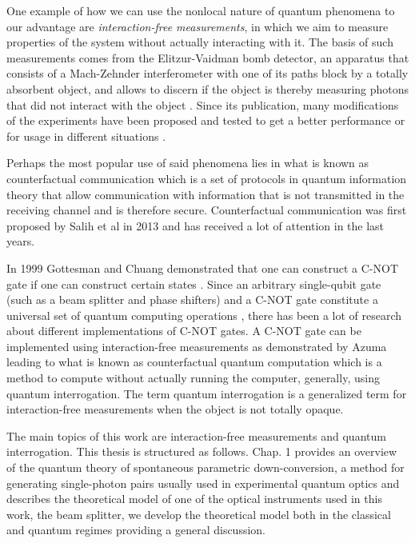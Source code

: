 \documentclass[12pt]{book}
\begin{document}
One example of how we can use the nonlocal nature of quantum phenomena to our advantage are \textit{interaction-free measurements}, in which we aim to measure properties of the system without actually interacting with it. The basis of such measurements comes from the Elitzur-Vaidman bomb detector, an apparatus that consists of a Mach-Zehnder interferometer with one of its paths block by a totally absorbent object, and allows to discern if the object is thereby measuring photons that did not interact with the object  \cite{Elitzur}. Since its publication, many modifications of the experiments have been proposed and tested to get a better performance or for usage in different situations \cite{Azuma,exp,QI1,Azuma2018,electronic}.

Perhaps the most popular use of said phenomena lies in what is known as counterfactual communication which is a set of protocols in quantum information theory that allow communication with information that is not transmitted in the receiving channel and is therefore secure. Counterfactual communication was first proposed by Salih et al in 2013 \cite{CComunication} and has received a lot of attention in the last years.

In 1999 Gottesman and Chuang demonstrated that one can construct a C-NOT gate if one can construct certain states \cite{Gottesman}. Since an arbitrary single-qubit gate (such as a beam splitter and phase shifters) and a C-NOT gate constitute a universal set of quantum computing operations \cite{chuang}, there has been a lot of research about different implementations of C-NOT gates. A C-NOT gate can be implemented using interaction-free measurements as demonstrated by Azuma \cite{AzumaComputation} leading to what is known as counterfactual quantum computation which is a method to compute without actually running the computer, generally, using quantum interrogation\cite{Hosten}. The term quantum interrogation is a generalized term for interaction-free measurements when the object is not totally opaque.


\thispagestyle{plain}


The main topics of this work are interaction-free measurements and quantum interrogation. This thesis is structured as follows. Chap. 1 provides an overview of the quantum theory of spontaneous parametric down-conversion, a method for generating single-photon pairs usually used in experimental quantum optics and describes the theoretical model of one of the optical instruments used in this work, the beam splitter, we develop the theoretical model both in the classical and quantum regimes providing a general discussion.
\end{document}
